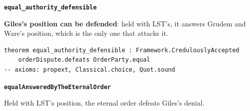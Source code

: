 \documentclass[11pt,paper=\testimonypaper,DIV=13,parskip=false]{scrartcl}
\begin{document}
\par\medskip\noindent\textbf{\texttt{equal\_\allowbreak{}authority\_\allowbreak{}defensible}}\par\nobreak\noindent
\textbf{Giles’s position can be defended}: held with LST’s, it answers Grudem and Ware’s position, which is the only one that attacks it.

{\small\begin{verbatim}
theorem equal_authority_defensible : Framework.CredulouslyAccepted
    orderDispute.defeats OrderParty.equal
-- axioms: propext, Classical.choice, Quot.sound
\end{verbatim}}
\par\medskip\noindent\textbf{\texttt{equal\allowbreak{}Answered\allowbreak{}By\allowbreak{}The\allowbreak{}Eternal\allowbreak{}Order}}\par\nobreak\noindent
Held with LST’s position, the eternal order defeats Giles’s denial.
\end{document}
